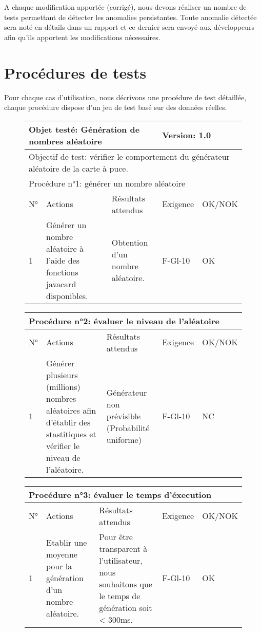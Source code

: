 \documentclass[a4paper,11pt,french]{article}
\begin{document}
A chaque modification apportée (corrigé), nous devons réaliser un nombre de tests permettant de détecter les
anomalies persistantes. Toute anomalie détectée sera noté en détails dans un rapport et ce dernier sera envoyé
 aux développeurs afin qu'ils apportent les modifications nécessaires.

\section{Procédures de tests}
Pour chaque cas d’utilisation, nous décrivons une procédure de test détaillée, chaque
procédure dispose d'un jeu de test basé sur des données réelles.


\begin{figure}[!h]
\begin{tabular}{|p{1cm}|p{5cm}|p{5cm}|p{2cm}|p{2cm}|}
\hline
\multicolumn{3}{|l|}{Objet testé: Génération de nombres aléatoire} & \multicolumn{2}{|l|}{Version: 1.0} \\
\hline
\multicolumn{5}{|l|}{Objectif de test: vérifier le comportement du générateur aléatoire de la carte à puce.} \\
\hline
\multicolumn{5}{|l|}{Procédure n°1: générer un nombre aléatoire} \\
\hline
N° & Actions & Résultats attendus & Exigence & OK/NOK \\
\hline
1 & Générer un nombre aléatoire à l'aide des fonctions javacard disponibles. & Obtention d'un nombre aléatoire. & F-Gl-10 & OK \\
\hline
\end{tabular}
\end{figure}


\begin{figure}[!h]
\begin{tabular}{|p{1cm}|p{5cm}|p{5cm}|p{2cm}|p{2cm}|}
\hline
\multicolumn{5}{|l|}{Procédure n°2: évaluer le niveau de l'aléatoire} \\
\hline
N° & Actions & Résultats attendus & Exigence & OK/NOK \\
\hline
1 & Générer plusieurs (millions) nombres aléatoires afin d'établir des stastitiques et vérifier le niveau de l'aléatoire. &
Générateur non prévisible (Probabilité uniforme) & F-Gl-10 & NC \\
\hline
\end{tabular}
\end{figure}



\begin{figure}[!h]
\begin{tabular}{|p{1cm}|p{5cm}|p{5cm}|p{2cm}|p{2cm}|}
\hline
\multicolumn{5}{|l|}{Procédure n°3: évaluer le temps d'éxecution} \\
\hline
N° & Actions & Résultats attendus & Exigence & OK/NOK \\
\hline
1 & Etablir une moyenne pour la génération d'un nombre aléatoire. & Pour être transparent à l'utilisateur, nous souhaitons que le temps de génération soit < 300ms. & F-Gl-10 & OK \\
\hline
\end{tabular}
\end{figure}
\end{document}
